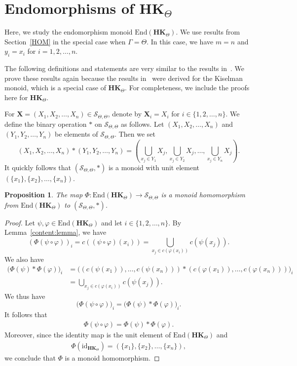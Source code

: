 \documentclass[pdflatex,sn-mathphys-num]{sn-jnl}
\newcommand{\hk}{\mathbf{HK}_{\Theta}}
\newcommand{\vp}{\varphi}
\newtheorem{proposition}[theorem]{Proposition}
\theoremstyle{definition}
\theoremstyle{remark}
\begin{document}
\section{Endomorphisms of $\hk$}\label{ENDO}

Here, we study the endomorphism monoid $\mathrm{End}(\hk)$.
We use results from Section~\ref{HOM} in the special case when $\Gamma = \Theta$.
In this case, we have $m = n$ and $y_i = x_i$ for $i = 1, 2, \dots, n$.

The following definitions and statements are very similar to the results in~\cite{andrensek}.
We prove these results again because the results in~\cite{andrensek} were derived for the Kiselman monoid, which is a special case of $\hk$.
For completeness, we include the proofs here for $\hk$.

For $\mathbf{X} = (X_1, X_2, \dots, X_n) \in \mathcal{S}_{\Theta, \Theta}$, denote by $\mathbf{X}_i = X_i$ for $i \in \{1, 2, \dots, n\}$.
We define the binary operation $\ast$ on $\mathcal{S}_{\Theta, \Theta}$ as follows.
Let $(X_1, X_2, \dots, X_n)$ and $(Y_1, Y_2, \dots, Y_n)$ be elements of $\mathcal{S}_{\Theta, \Theta}$.
Then we set
\[
(X_1, X_2, \dots, X_n) \ast (Y_1, Y_2, \dots, Y_n) = (\bigcup_{x_j \in Y_1} X_j, \bigcup_{x_j \in Y_2} X_j, \dots, \bigcup_{x_j \in Y_n} X_j).
\]
It quickly follows that $(\mathcal{S}_{\Theta, \Theta}, \ast)$ is a monoid with unit element $(\{x_1\}, \{x_2\}, \dots, \{x_n\})$.

\begin{proposition}\label{phi:homo}
   The map $\Phi : \mathrm{End}(\hk) \to \mathcal{S}_{\Theta, \Theta}$ is a monoid homomorphism from $\mathrm{End}(\hk)$ to $(\mathcal{S}_{\Theta, \Theta}, \ast)$.
\end{proposition}

\begin{proof} 
   Let $\psi, \vp \in \mathrm{End}(\hk)$ and let $i \in \{1, 2, \dots, n\}$.
   By Lemma~\ref{content:lemma}, we have 
   \[
   (\Phi(\psi \circ \vp))_i = c((\psi \circ \vp)(x_i)) = \bigcup_{x_j \in c(\vp(x_i))} c(\psi(x_j)).
   \]
   We also have
   \begin{align*}
      \big(\Phi(\psi) \ast \Phi(\vp)\big)_i &= \big( (c(\psi(x_1)), \dots, c(\psi(x_n))) \ast (c(\vp(x_1)), \dots, c(\vp(x_n))) \big)_i \\
      &= \bigcup_{x_j \in c(\vp(x_i))} c(\psi(x_j)).
   \end{align*}
   We thus have
   \[
   \big(\Phi(\psi \circ \vp)\big)_i = \big(\Phi(\psi) \ast \Phi(\vp)\big)_i.
   \]
   It follows that
   \begin{align*}
      \Phi(\psi \circ \vp) = \Phi(\psi) \ast \Phi(\vp).
   \end{align*}
   Moreover, since the identity map is the unit element of $\mathrm{End}(\hk)$ and
   \begin{align*}
      \Phi(\mathrm{id}_{\hk}) = (\{x_1\}, \{x_2\}, \dots, \{x_n\}),
   \end{align*}
   we conclude that $\Phi$ is a monoid homomorphism. 
\end{proof}
\end{document}

